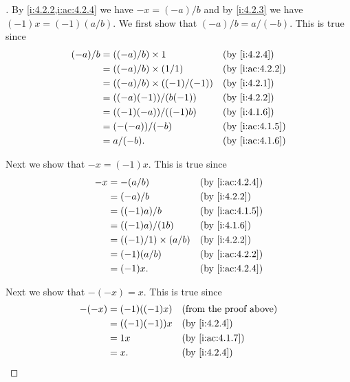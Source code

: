 \begin{proof}[]
  By \cref{i:4.2.2,i:ac:4.2.4} we have \(-x = (-a) / b\) and by \cref{i:4.2.3} we have \((-1) x = (-1) (a / b)\).
  We first show that \((-a) / b = a / (-b)\).
  This is true since
  \begin{align*}
    (-a) / b & = ((-a) / b) \times 1             &  & \by{i:4.2.4}    \\
             & = ((-a) / b) \times (1 / 1)       &  & \by{i:ac:4.2.2} \\
             & = ((-a) / b) \times ((-1) / (-1)) &  & \by{i:4.2.1}    \\
             & = ((-a) (-1)) / (b (-1))          &  & \by{i:4.2.2}    \\
             & = ((-1) (-a)) / ((-1) b)          &  & \by{i:4.1.6}    \\
             & = (-(-a)) / (-b)                  &  & \by{i:ac:4.1.5} \\
             & = a / (-b).                       &  & \by{i:ac:4.1.6}
  \end{align*}

  Next we show that \(-x = (-1) x\).
  This is true since
  \begin{align*}
    -x & = -(a / b)                  &  & \by{i:ac:4.2.4} \\
       & = (-a) / b                  &  & \by{i:4.2.2}    \\
       & = ((-1) a) / b              &  & \by{i:ac:4.1.5} \\
       & = ((-1) a) / (1b)           &  & \by{i:4.1.6}    \\
       & = ((-1) / 1) \times (a / b) &  & \by{i:4.2.2}    \\
       & = (-1) (a / b)              &  & \by{i:ac:4.2.2} \\
       & = (-1) x.                   &  & \by{i:ac:4.2.4}
  \end{align*}

  Next we show that \(-(-x) = x\).
  This is true since
  \begin{align*}
    -(-x) & = (-1) ((-1) x) &  & \text{(from the proof above)} \\
          & = ((-1) (-1)) x &  & \by{i:4.2.4}                  \\
          & = 1 x           &  & \by{i:ac:4.1.7}               \\
          & = x.            &  & \by{i:4.2.4}
  \end{align*}


\end{proof}
